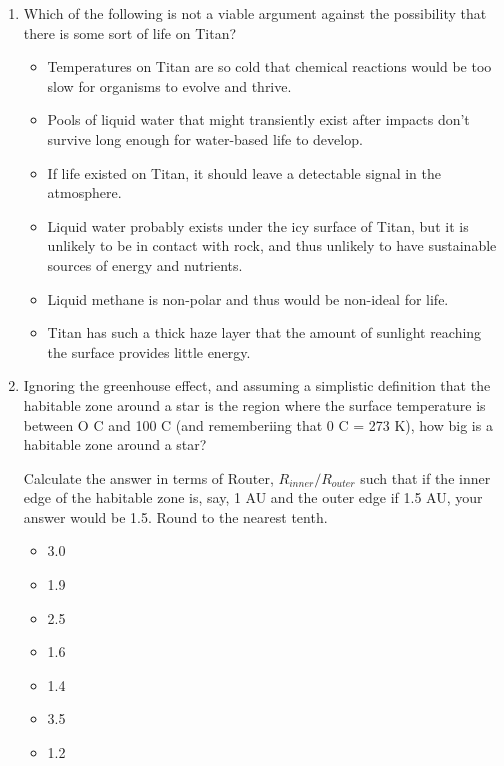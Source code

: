 \begin{enumerate}
\item[3.] Which of the following is  not  a viable argument against the possibility that there is some sort of life on Titan?

\begin{itemize}[label={$\bullet$}]
    \item Temperatures on Titan are so cold that chemical reactions would be too slow for organisms to evolve and thrive.
    \item Pools of liquid water that might transiently exist after impacts don't survive long enough for water-based life to develop.
    \item If life existed on Titan, it should leave a detectable signal in the atmosphere.
    \item Liquid water probably exists under the icy surface of Titan, but it is unlikely to be in contact with rock, and thus unlikely to have sustainable sources of energy and nutrients.
    \item Liquid methane is non-polar and thus would be non-ideal for life.
    \item Titan has such a thick haze layer that the amount of sunlight reaching the surface provides little energy.
\end{itemize}

\item[4.] Ignoring the greenhouse effect, and assuming a simplistic definition that the habitable zone around a star is the region where the surface temperature is between O C and 100 C (and rememberiing that 0 C = 273 K), how big is a habitable zone around a star?

Calculate the answer in terms of Router, $R_{inner} / R_{outer}$ such that if the inner edge of the habitable zone is, say, 1 AU and the outer edge if 1.5 AU, your answer would be 1.5. Round to the nearest tenth.

\begin{multicols}{4}
\begin{itemize}[label={$\bullet$}]
    \item 3.0
    \item 1.9
    \item 2.5
    \item 1.6
    \item 1.4
    \item 3.5
    \item 1.2
\end{itemize}
\end{multicols}


\end{enumerate}
